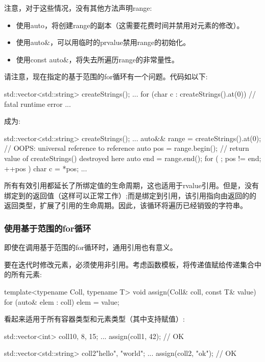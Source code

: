 注意，对于这些情况，没有其他方法声明range:

\begin{itemize}
	\item 使用auto，将创建range的副本（这需要花费时间并禁用对元素的修改）。
	\item 使用auto\&，可以用临时的prvalue禁用range的初始化。
	\item 使用const auto\&，将失去所遍历range的非常量性。
\end{itemize}

请注意，现在指定的基于范围的for循环有一个问题。代码如以下:

\begin{cppcode}
std::vector<std::string> createStrings();
...
for (char c : createStrings().at(0)) { // fatal runtime error
	...
}
\end{cppcode}

成为:

\begin{cppcode}
std::vector<std::string> createStrings();
...
auto&& range = createStrings().at(0); // OOPS: universal reference to reference
auto pos = range.begin(); // return value of createStrings() destroyed here
auto end = range.end();
for ( ; pos != end; ++pos ) {
	char c = *pos;
	...
}
\end{cppcode}

所有有效引用都延长了所绑定值的生命周期，这也适用于rvalue引用。但是，没有绑定到的返回值（这样可以正常工作）;而是绑定到引用，该引用指向由返回的的返回类型，扩展了引用的生命周期。因此，该循环将遍历已经销毁的字符串。

\subsubsection{使用基于范围的for循环}

即使在调用基于范围的for循环时，通用引用也有意义。

要在迭代时修改元素，必须使用非引用。考虑函数模板，将传递值赋给传递集合中的所有元素:

\begin{cppcode}
template<typename Coll, typename T>
void assign(Coll& coll, const T& value) {
	for (auto& elem : coll) {
		elem = value;
	}
}
\end{cppcode}

看起来适用于所有容器类型和元素类型（其中支持赋值）:

\begin{cppcode}
std::vector<int> coll1{0, 8, 15};
...
assign(coll1, 42); // OK

std::vector<std::string> coll2{"hello", "world"};
...
assign(coll2, "ok"); // OK
\end{cppcode}

